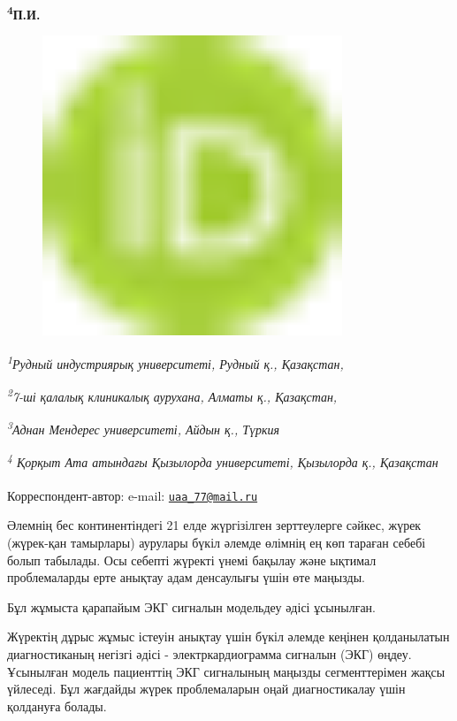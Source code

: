 {\bfseries \textsuperscript{4}П.И.
\begin{figure}[H]
	\centering
	\includegraphics[width=0.8\textwidth]{media/ict/image1}
	\caption*{}
\end{figure}


\emph{\textsuperscript{1}Рудный индустриярық университеті, Рудный қ.,
Қазақстан,}

\emph{\textsuperscript{2}7-ші қалалық клиникалық аурухана, Алматы қ.,
Қазақстан,}

\emph{\textsuperscript{3}Аднан Мендерес университеті, Айдын қ., Түркия}

\emph{\textsuperscript{4} Қорқыт Ата атындағы Қызылорда университеті,
Қызылорда қ., Қазақстан}

{\bfseries \textsuperscript{\envelope }}Корреспондент-автор: e-mail:
\href{mailto:uaa_77@mail.ru}{\nolinkurl{uaa\_77@mail.ru}}

Әлемнің бес континентіндегі 21 елде жүргізілген зерттеулерге сәйкес,
жүрек (жүрек-қан тамырлары) аурулары бүкіл әлемде өлімнің ең көп тараған
себебі болып табылады. Осы себепті жүректі үнемі бақылау және ықтимал
проблемаларды ерте анықтау адам денсаулығы үшін өте маңызды.

Бұл жұмыста қарапайым ЭКГ сигналын модельдеу әдісі ұсынылған.

Жүректің дұрыс жұмыс істеуін анықтау үшін бүкіл әлемде кеңінен
қолданылатын диагностиканың негізгі әдісі - электркардиограмма сигналын
(ЭКГ) өңдеу. Ұсынылған модель пациенттің ЭКГ сигналының маңызды
сегменттерімен жақсы үйлеседі. Бұл жағдайды жүрек проблемаларын оңай
диагностикалау үшін қолдануға болады.

}
